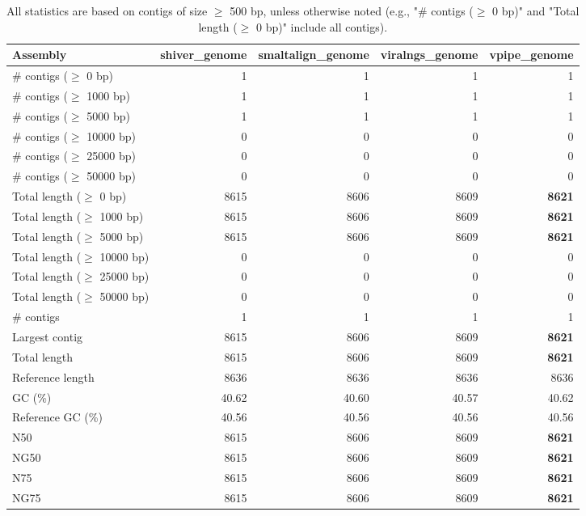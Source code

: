 \documentclass[12pt,a4paper]{article}
\begin{document}
\begin{table}[ht]
\begin{center}
\caption{All statistics are based on contigs of size $\geq$ 500 bp, unless otherwise noted (e.g., "\# contigs ($\geq$ 0 bp)" and "Total length ($\geq$ 0 bp)" include all contigs).}
\begin{tabular}{|l*{4}{|r}|}
\hline
Assembly & shiver\_genome & smaltalign\_genome & viralngs\_genome & vpipe\_genome \\ \hline
\# contigs ($\geq$ 0 bp) & 1 & 1 & 1 & 1 \\ \hline
\# contigs ($\geq$ 1000 bp) & 1 & 1 & 1 & 1 \\ \hline
\# contigs ($\geq$ 5000 bp) & 1 & 1 & 1 & 1 \\ \hline
\# contigs ($\geq$ 10000 bp) & 0 & 0 & 0 & 0 \\ \hline
\# contigs ($\geq$ 25000 bp) & 0 & 0 & 0 & 0 \\ \hline
\# contigs ($\geq$ 50000 bp) & 0 & 0 & 0 & 0 \\ \hline
Total length ($\geq$ 0 bp) & 8615 & 8606 & 8609 & {\bf 8621} \\ \hline
Total length ($\geq$ 1000 bp) & 8615 & 8606 & 8609 & {\bf 8621} \\ \hline
Total length ($\geq$ 5000 bp) & 8615 & 8606 & 8609 & {\bf 8621} \\ \hline
Total length ($\geq$ 10000 bp) & 0 & 0 & 0 & 0 \\ \hline
Total length ($\geq$ 25000 bp) & 0 & 0 & 0 & 0 \\ \hline
Total length ($\geq$ 50000 bp) & 0 & 0 & 0 & 0 \\ \hline
\# contigs & 1 & 1 & 1 & 1 \\ \hline
Largest contig & 8615 & 8606 & 8609 & {\bf 8621} \\ \hline
Total length & 8615 & 8606 & 8609 & {\bf 8621} \\ \hline
Reference length & 8636 & 8636 & 8636 & 8636 \\ \hline
GC (\%) & 40.62 & 40.60 & 40.57 & 40.62 \\ \hline
Reference GC (\%) & 40.56 & 40.56 & 40.56 & 40.56 \\ \hline
N50 & 8615 & 8606 & 8609 & {\bf 8621} \\ \hline
NG50 & 8615 & 8606 & 8609 & {\bf 8621} \\ \hline
N75 & 8615 & 8606 & 8609 & {\bf 8621} \\ \hline
NG75 & 8615 & 8606 & 8609 & {\bf 8621} \\ \hline

\end{tabular}
\end{center}
\end{table}
\end{document}
